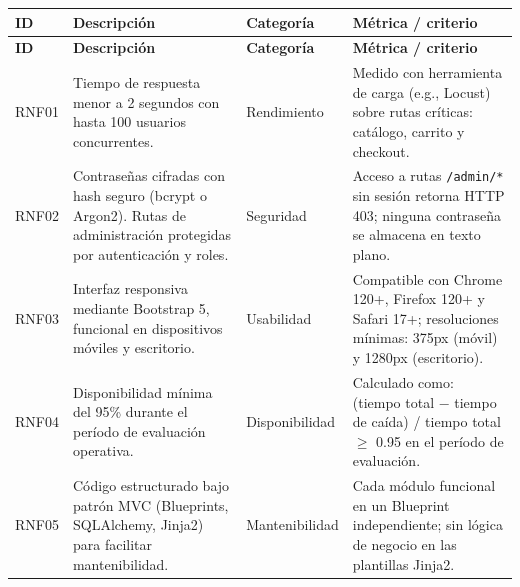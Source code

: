 \documentclass[12pt,a4paper]{article}
\begin{document}
\begin{longtable}{|l|p{7cm}|p{3cm}|p{3.5cm}|}
    \hline
    \textbf{ID} & \textbf{Descripción}                                                                                                  & \textbf{Categoría}     & \textbf{Métrica / criterio} \\ \hline
    \endfirsthead
    \hline
    \textbf{ID} & \textbf{Descripción}                                                                                                  & \textbf{Categoría}     & \textbf{Métrica / criterio} \\ \hline
    \endhead

    RNF01       & Tiempo de respuesta menor a 2 segundos con hasta 100 usuarios concurrentes.                                           & Rendimiento            &
    Medido con herramienta de carga (e.g., Locust) sobre rutas críticas: catálogo, carrito y checkout.                                                                                         \\ \hline

    RNF02       & Contraseñas cifradas con hash seguro (bcrypt o Argon2). Rutas de administración protegidas por autenticación y roles. & Seguridad              &
    Acceso a rutas \texttt{/admin/*} sin sesión retorna HTTP 403; ninguna contraseña se almacena en texto plano.                                                                               \\ \hline

    RNF03       & Interfaz responsiva mediante Bootstrap 5, funcional en dispositivos móviles y escritorio.                             & Usabilidad             &
    Compatible con Chrome 120+, Firefox 120+ y Safari 17+; resoluciones mínimas: 375px (móvil) y 1280px (escritorio).                                                                          \\ \hline

    RNF04       & Disponibilidad mínima del 95\% durante el período de evaluación operativa.                                            & Disponibilidad         &
    Calculado como: (tiempo total $-$ tiempo de caída) / tiempo total $\geq$ 0.95 en el período de evaluación.                                                                                 \\ \hline

    RNF05       & Código estructurado bajo patrón MVC (Blueprints, SQLAlchemy, Jinja2) para facilitar mantenibilidad.                   & Mantenibilidad         &
    Cada módulo funcional en un Blueprint independiente; sin lógica de negocio en las plantillas Jinja2.                                                                                       \\ \hline


\end{longtable}
\end{document}
